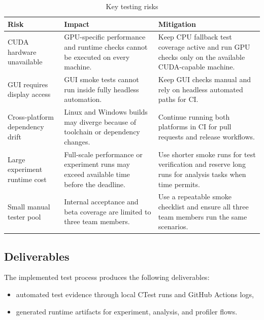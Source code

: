 \begin{table}[H]
	\centering
	\caption{Key testing risks}
	\label{tab:risks}
	\begin{tabularx}{\textwidth}{@{}>{\ttfamily\small}lX X@{}}
		\toprule
		\textbf{Risk}                   & \textbf{Impact}                                                                          & \textbf{Mitigation}                                                                                      \\
		\midrule
		CUDA hardware unavailable       & GPU-specific performance and runtime checks cannot be executed on every machine.         & Keep CPU fallback test coverage active and run GPU checks only on the available CUDA-capable machine.    \\
		GUI requires display access     & GUI smoke tests cannot run inside fully headless automation.                             & Keep GUI checks manual and rely on headless automated paths for CI.                                      \\
		Cross-platform dependency drift & Linux and Windows builds may diverge because of toolchain or dependency changes.         & Continue running both platforms in CI for pull requests and release workflows.                           \\
		Large experiment runtime cost   & Full-scale performance or experiment runs may exceed available time before the deadline. & Use shorter smoke runs for test verification and reserve long runs for analysis tasks when time permits. \\
		Small manual tester pool        & Internal acceptance and beta coverage are limited to three team members.                 & Use a repeatable smoke checklist and ensure all three team members run the same scenarios.               \\
		\bottomrule
	\end{tabularx}
\end{table}

\subsection{Deliverables}

The implemented test process produces the following deliverables:

\begin{itemize}[nosep]
	\item automated test evidence through local CTest runs and GitHub Actions logs,
	\item generated runtime artifacts for experiment, analysis, and profiler flows.
\end{itemize}
